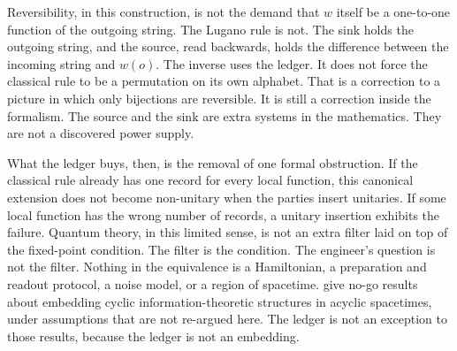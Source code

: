 \documentclass[11pt]{article}
\begin{document}
Reversibility, in this construction, is not the demand that \(w\) itself be a one-to-one function of the outgoing string. The Lugano rule is not. The sink holds the outgoing string, and the source, read backwards, holds the difference between the incoming string and \(w(o)\). The inverse uses the ledger. It does not force the classical rule to be a permutation on its own alphabet. That is a correction to a picture in which only bijections are reversible. It is still a correction inside the formalism. The source and the sink are extra systems in the mathematics. They are not a discovered power supply.

What the ledger buys, then, is the removal of one formal obstruction. If the classical rule already has one record for every local function, this canonical extension does not become non-unitary when the parties insert unitaries. If some local function has the wrong number of records, a unitary insertion exhibits the failure. Quantum theory, in this limited sense, is not an extra filter laid on top of the fixed-point condition. The filter is the condition. The engineer’s question is not the filter. Nothing in the equivalence is a Hamiltonian, a preparation and readout protocol, a noise model, or a region of spacetime. \citet{vilasini2024} give no-go results about embedding cyclic information-theoretic structures in acyclic spacetimes, under assumptions that are not re-argued here. The ledger is not an exception to those results, because the ledger is not an embedding.
\end{document}
